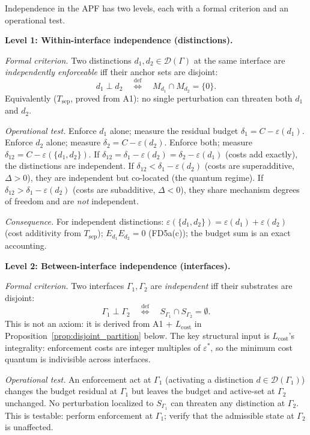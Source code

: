 \documentclass[11pt]{article}
\theoremstyle{remark}
\begin{document}
\begin{tcolorbox}[defbox, title={Definition: Independence (Two Levels)}]
\label{def:independence}

Independence in the APF has two levels, each with a formal criterion and an operational test.

\medskip\noindent\textbf{Level 1: Within-interface independence (distinctions).}

\textit{Formal criterion.}  Two distinctions $d_1, d_2 \in \mathcal{D}(\Gamma)$ at the same interface are \emph{independently enforceable} iff their anchor sets are disjoint:
\[
d_1 \perp d_2 \quad\stackrel{\mathrm{def}}{\Longleftrightarrow}\quad M_{d_1} \cap M_{d_2} = \{0\}.
\]
Equivalently ($T_{\mathrm{sep}}$, proved from A1): no single perturbation can threaten both $d_1$ and $d_2$.

\textit{Operational test.}  Enforce $d_1$ alone; measure the residual budget $\delta_1 = C - \varepsilon(d_1)$.  Enforce $d_2$ alone; measure $\delta_2 = C - \varepsilon(d_2)$.  Enforce both; measure $\delta_{12} = C - \varepsilon(\{d_1, d_2\})$.  If $\delta_{12} = \delta_1 - \varepsilon(d_2) = \delta_2 - \varepsilon(d_1)$ (costs add exactly), the distinctions are independent.  If $\delta_{12} < \delta_1 - \varepsilon(d_2)$ (costs are superadditive, $\Delta > 0$), they are independent but co-located (the quantum regime).  If $\delta_{12} > \delta_1 - \varepsilon(d_2)$ (costs are subadditive, $\Delta < 0$), they share mechanism degrees of freedom and are \emph{not} independent.

\textit{Consequence.}  For independent distinctions: $\varepsilon(\{d_1, d_2\}) = \varepsilon(d_1) + \varepsilon(d_2)$ (cost additivity from $T_{\mathrm{sep}}$); $E_{d_1} E_{d_2} = 0$ (FD5a(c)); the budget sum is an exact accounting.

\medskip\noindent\textbf{Level 2: Between-interface independence (interfaces).}

\textit{Formal criterion.}  Two interfaces $\Gamma_1, \Gamma_2$ are \emph{independent} iff their substrates are disjoint:
\[
\Gamma_1 \perp \Gamma_2 \quad\stackrel{\mathrm{def}}{\Longleftrightarrow}\quad S_{\Gamma_1} \cap S_{\Gamma_2} = \emptyset.
\]
This is not an axiom: it is derived from A1 + $L_{\mathrm{cost}}$ in Proposition~\ref{prop:disjoint_partition} below.  The key structural input is $L_{\mathrm{cost}}$'s integrality: enforcement costs are integer multiples of $\varepsilon^*$, so the minimum cost quantum is indivisible across interfaces.

\textit{Operational test.}  An enforcement act at $\Gamma_1$ (activating a distinction $d \in \mathcal{D}(\Gamma_1)$) changes the budget residual at $\Gamma_1$ but leaves the budget and active-set at $\Gamma_2$ unchanged.  No perturbation localized to $S_{\Gamma_1}$ can threaten any distinction at $\Gamma_2$.  This is testable: perform enforcement at $\Gamma_1$; verify that the admissible state at $\Gamma_2$ is unaffected.


\end{tcolorbox}
\end{document}
